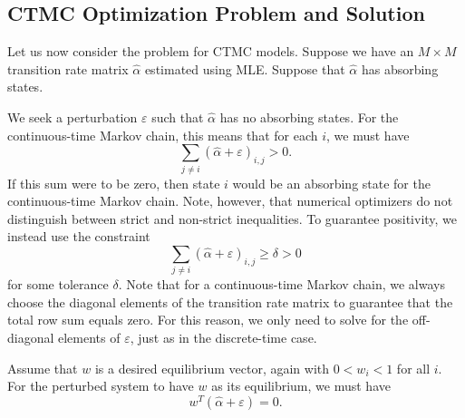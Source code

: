\documentclass[review,letterpaper,11pt]{elsarticle}
\begin{document}
\subsection{CTMC Optimization Problem and Solution}
Let us now consider the problem for CTMC models.  Suppose we have an $M \times M$ transition rate matrix $\widehat{\alpha}$ estimated using MLE.  Suppose that $\widehat{\alpha}$ has absorbing states.

We seek a perturbation $\varepsilon$ such that $\widehat{\alpha}$ has no absorbing states.  For the continuous-time Markov chain, this means that for each $i$, we must have
$$
\sum_{j \neq i} (\widehat{\alpha} + \varepsilon)_{i,j} > 0.
$$
If this sum were to be zero, then state $i$ would be an absorbing state for the continuous-time Markov chain.  Note, however, that numerical optimizers do not distinguish between strict and non-strict inequalities.  To guarantee positivity, we instead use the constraint
$$
\sum_{j \neq i} (\widehat{\alpha} + \varepsilon)_{i,j} \geq \delta > 0
$$
for some tolerance $\delta$.  Note that for a continuous-time Markov chain, we always choose the diagonal elements of the transition rate matrix to guarantee that the total row sum equals zero.  For this reason, we only need to solve for the off-diagonal elements of $\varepsilon$, just as in the discrete-time case.

Assume that $w$ is a desired equilibrium vector, again with $0 < w_i < 1$ for all $i$.  For the perturbed system to have $w$ as its equilibrium, we must have
$$
w^T (\widehat{\alpha} + \varepsilon) = 0.
$$
\end{document}
